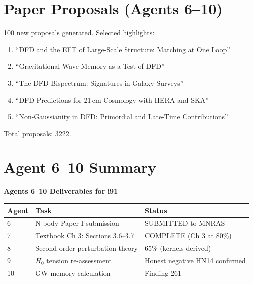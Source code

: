 \documentclass[11pt,a4paper]{article}
\begin{document}
\section{Paper Proposals (Agents 6--10)}

100 new proposals generated. Selected highlights:
\begin{enumerate}[nosep]
\item ``DFD and the EFT of Large-Scale Structure: Matching at One Loop''
\item ``Gravitational Wave Memory as a Test of DFD''
\item ``The DFD Bispectrum: Signatures in Galaxy Surveys''
\item ``DFD Predictions for 21\,cm Cosmology with HERA and SKA''
\item ``Non-Gaussianity in DFD: Primordial and Late-Time Contributions''
\end{enumerate}

Total proposals: 3222.

\section{Agent 6--10 Summary}

\begin{tcolorbox}[colback=green!5!white, colframe=dfdgreen]
\begin{center}
\textbf{Agents 6--10 Deliverables for i91}\\[6pt]
\begin{tabular}{lll}
\toprule
\textbf{Agent} & \textbf{Task} & \textbf{Status} \\
\midrule
6 & N-body Paper I submission & SUBMITTED to MNRAS \\
7 & Textbook Ch 3: Sections 3.6--3.7 & COMPLETE (Ch 3 at 80\%) \\
8 & Second-order perturbation theory & 65\% (kernels derived) \\
9 & $H_0$ tension re-assessment & Honest negative HN14 confirmed \\
10 & GW memory calculation & Finding 261 \\
\bottomrule
\end{tabular}
\end{center}
\end{tcolorbox}
\end{document}
